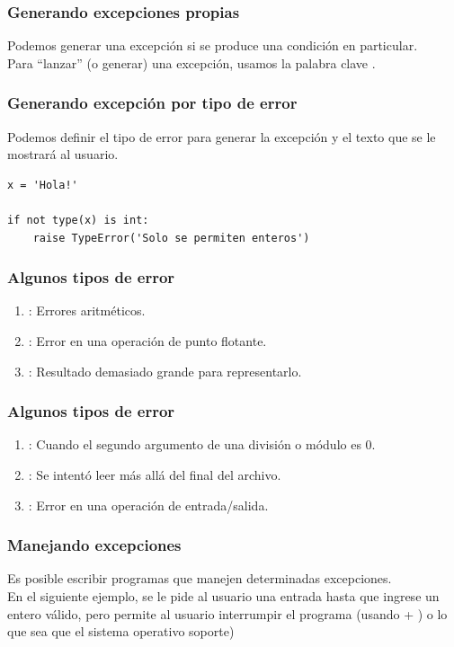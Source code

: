 \documentclass[12pt]{beamer}
\begin{document}
\begin{frame}
\frametitle{Generando excepciones propias}
Podemos generar una excepción si se produce una condición en particular.
\\
\bigskip
\pause
Para \enquote{lanzar} (o generar) una excepción, usamos la palabra clave .
\end{frame}
\begin{frame}[fragile]
\frametitle{Generando excepción por tipo de error}
Podemos definir el tipo de error para generar la excepción y el texto que se le mostrará al usuario.
\begin{lstlisting}[caption=Generando una excepción]
x = 'Hola!'

if not type(x) is int:
    raise TypeError('Solo se permiten enteros')
\end{lstlisting}    
\end{frame}
\begin{frame}
\frametitle{Algunos tipos de error}
\begin{enumerate}[<+->]
\item {}: Errores aritméticos.
\item {}: Error en una operación de punto flotante.
\item {}: Resultado demasiado grande para representarlo.
\seti
\end{enumerate}
\end{frame}
\begin{frame}
\frametitle{Algunos tipos de error}
\begin{enumerate}[<+->]
\conti    
\item {}: Cuando el segundo argumento de una división o módulo es $0$.
\item {}: Se intentó leer más allá del final del archivo.
\item {}: Error en una operación de entrada/salida.
\end{enumerate}
\end{frame}
\begin{frame}[fragile]
\frametitle{Manejando excepciones}
Es posible escribir programas que manejen determinadas excepciones. 
\\
\bigskip
En el siguiente ejemplo, se le pide al usuario una entrada hasta que ingrese un entero válido, pero permite al usuario interrumpir el programa (usando \keys{\ctrl} + ) o lo que sea que el sistema operativo soporte)
\end{frame}
\end{document}
